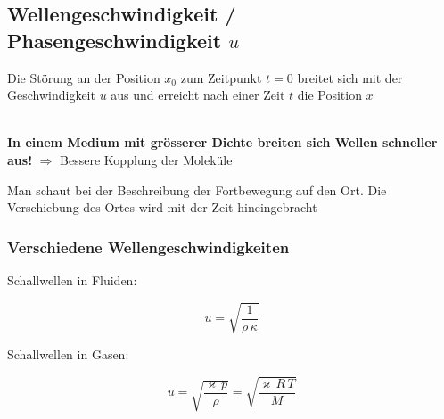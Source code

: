 \subsection{Wellengeschwindigkeit / Phasengeschwindigkeit $u$}
Die Störung an der Position $x_0$ zum Zeitpunkt $t=0$ breitet sich mit der Geschwindigkeit $u$ aus und erreicht nach einer Zeit $t$ die Position $x$ \\

 \\

\raggedright
\textbf{In einem Medium mit grösserer Dichte breiten sich Wellen schneller aus!} $\Rightarrow$ Bessere Kopplung der Moleküle \\
\vspace{0.5cm}

Man schaut bei der Beschreibung der Fortbewegung auf den Ort. Die Verschiebung des Ortes wird mit der Zeit hineingebracht 


\subsubsection{Verschiedene Wellengeschwindigkeiten}

\begin{minipage}{0.45\linewidth}
Schallwellen in Fluiden: 
\end{minipage}
\hfill
\begin{minipage}{0.48\linewidth}
$$\boxed{ u = \sqrt{\frac{1}{\rho \, \kappa}} }$$
\end{minipage}


\begin{minipage}{0.45\linewidth}
Schallwellen in Gasen:
\end{minipage}
\hfill
\begin{minipage}{0.48\linewidth}
$$\boxed{ u = \sqrt{\frac{\varkappa \, p}{\rho}} = \sqrt{\frac{\varkappa \, R \, T}{M}} }$$
\end{minipage}


